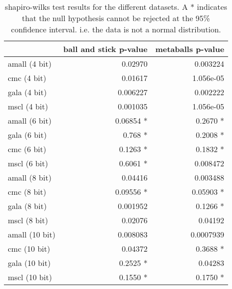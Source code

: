 \begin{table}
  \begin{tabular}{ | l | r | r | }
  \hline
                 & ball and stick p-value & metaballs p-value  \\ \hline
  amall (4 bit)  &                0.02970 &          0.003224  \\ \hline
  cmc (4 bit)    &                0.01617 &         1.056e-05  \\ \hline
  gala (4 bit)   &               0.006227 &          0.002222  \\ \hline
  mscl (4 bit)   &               0.001035 &         1.056e-05  \\ \hline
  \hline

  amall (6 bit)  &              0.06854 * &          0.2670 *  \\ \hline
  gala (6 bit)   &                0.768 * &          0.2008 *  \\ \hline
  cmc (6 bit)    &               0.1263 * &          0.1832 *  \\ \hline
  mscl (6 bit)   &               0.6061 * &          0.008472  \\ \hline
  \hline

  amall (8 bit)  &                0.04416 &          0.003488  \\ \hline
  cmc (8 bit)    &              0.09556 * &         0.05903 *  \\ \hline
  gala (8 bit)   &               0.001952 &          0.1266 *  \\ \hline
  mscl (8 bit)   &                0.02076 &           0.04192  \\ \hline
  \hline

  amall (10 bit) &               0.008083 &         0.0007939  \\ \hline
  cmc (10 bit)   &                0.04372 &          0.3688 *  \\ \hline
  gala (10 bit)  &               0.2525 * &           0.04283  \\ \hline
  mscl (10 bit)  &               0.1550 * &          0.1750 *  \\ \hline
  \end{tabular}
  \caption{shapiro-wilks test results for the different datasets. A *
  indicates that the null hypothesis cannot be rejected at the 95\% confidence
  interval. i.e. the data is not a normal distribution.}
  \label{tab:appendix_dataset_normality}
\end{table}


